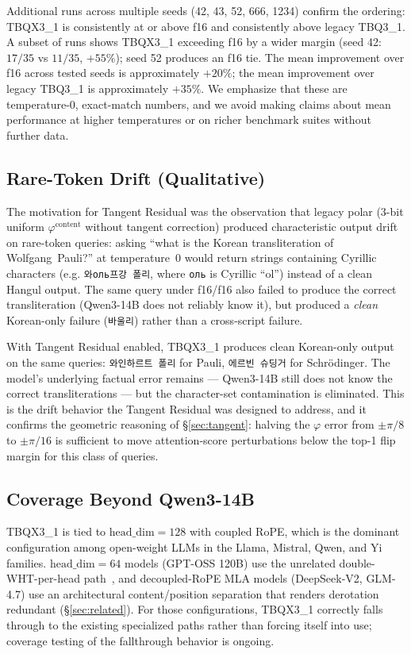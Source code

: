 \documentclass[10pt,twocolumn]{article}
\begin{document}
Additional runs across multiple seeds (42, 43, 52, 666, 1234) confirm the ordering: TBQX3\_1 is consistently at or above f16 and consistently above legacy TBQ3\_1. A subset of runs shows TBQX3\_1 exceeding f16 by a wider margin (seed 42: $17/35$ vs $11/35$, $+55\%$); seed 52 produces an f16 tie. The mean improvement over f16 across tested seeds is approximately $+20\%$; the mean improvement over legacy TBQ3\_1 is approximately $+35\%$. We emphasize that these are temperature-$0$, exact-match numbers, and we avoid making claims about mean performance at higher temperatures or on richer benchmark suites without further data.

\subsection{Rare-Token Drift (Qualitative)}

The motivation for Tangent Residual was the observation that legacy polar (3-bit uniform $\varphi^{\text{content}}$ without tangent correction) produced characteristic output drift on rare-token queries: asking ``what is the Korean transliteration of Wolfgang~Pauli?'' at temperature~$0$ would return strings containing Cyrillic characters (e.g. \texttt{와оль프강 폴리}, where \texttt{оль} is Cyrillic ``ol'') instead of a clean Hangul output. The same query under f16/f16 also failed to produce the correct transliteration (Qwen3-14B does not reliably know it), but produced a \emph{clean} Korean-only failure (\texttt{바울리}) rather than a cross-script failure.

With Tangent Residual enabled, TBQX3\_1 produces clean Korean-only output on the same queries: \texttt{와인하르트 폴리} for Pauli, \texttt{에르빈 슈딩거} for Schr\"{o}dinger. The model's underlying factual error remains --- Qwen3-14B still does not know the correct transliterations --- but the character-set contamination is eliminated. This is the drift behavior the Tangent Residual was designed to address, and it confirms the geometric reasoning of \S\ref{sec:tangent}: halving the $\varphi$ error from $\pm\pi/8$ to $\pm\pi/16$ is sufficient to move attention-score perturbations below the top-1 flip margin for this class of queries.

\subsection{Coverage Beyond Qwen3-14B}

TBQX3\_1 is tied to $\text{head\_dim}=128$ with coupled RoPE, which is the dominant configuration among open-weight LLMs in the Llama, Mistral, Qwen, and Yi families. $\text{head\_dim}=64$ models (GPT-OSS 120B) use the unrelated double-WHT-per-head path~\cite{turboquant_impl2026}, and decoupled-RoPE MLA models (DeepSeek-V2, GLM-4.7) use an architectural content/position separation that renders derotation redundant (\S\ref{sec:related}). For those configurations, TBQX3\_1 correctly falls through to the existing specialized paths rather than forcing itself into use; coverage testing of the fallthrough behavior is ongoing.
\end{document}
